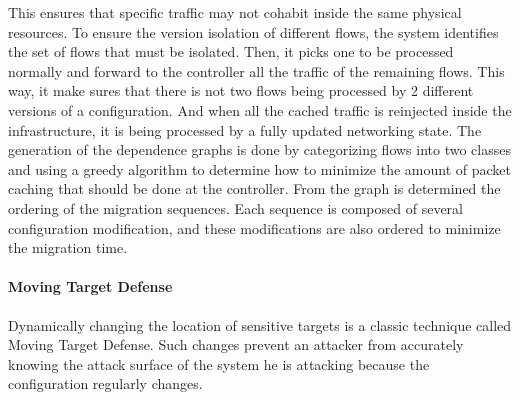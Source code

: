This ensures that specific traffic may not cohabit inside the same physical resources.
To ensure the version isolation of different flows, the system identifies the set of flows that must be isolated. Then, it picks one to be processed normally and forward to the controller all the traffic of the remaining flows. This way, it make sures that there is not two flows being processed by 2 different versions of a configuration. And when all the cached traffic is reinjected inside the infrastructure, it is being processed by a fully updated networking state.
The generation of the dependence graphs is done by categorizing flows into two classes and using a greedy algorithm to determine how to minimize the amount of packet caching that should be done at the controller.
From the graph is determined the ordering of the migration sequences. Each sequence is composed of several configuration modification, and these modifications are also ordered to minimize the migration time. 

\paragraph{Moving Target Defense} Dynamically changing the location of sensitive targets is a classic technique called Moving Target Defense. Such changes prevent an attacker from accurately knowing the attack surface of the system he is attacking because the configuration regularly changes.

\cite{coconut-ghorbani2017,toward-Ghorbani2014,Chowdhary2016}


